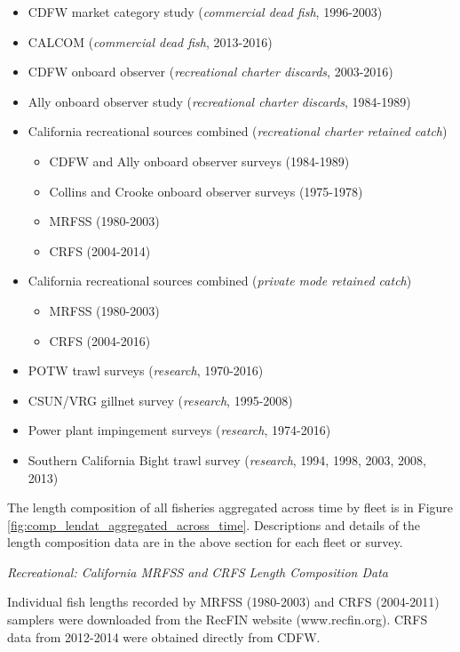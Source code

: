 \documentclass[12pt,]{article}
\begin{document}
\begin{itemize}[noitemsep,nolistsep,topsep=0pt]
  \item CDFW market category study (\emph{commercial dead fish}, 1996-2003)    
  \item CALCOM (\emph{commercial dead fish}, 2013-2016)    
  \item CDFW onboard observer (\emph{recreational charter discards}, 2003-2016)    
  \item Ally onboard observer study (\emph{recreational charter discards}, 1984-1989)  
  \item California recreational sources combined (\emph{recreational charter retained catch})     
    \begin{itemize}[noitemsep,nolistsep]
      \item CDFW and Ally onboard observer surveys (1984-1989)     
      \item Collins and Crooke onboard observer surveys (1975-1978)     
      \item MRFSS (1980-2003)     
      \item CRFS (2004-2014)
    \end{itemize}
 \item California recreational sources combined (\emph{private mode retained catch})      
    \begin{itemize}[noitemsep,nolistsep]   
      \item MRFSS (1980-2003)      
      \item CRFS (2004-2016)  
    \end{itemize}
 \item POTW trawl surveys (\emph{research}, 1970-2016)      
 \item CSUN/VRG gillnet survey (\emph{research}, 1995-2008)        
 \item Power plant impingement surveys (\emph{research}, 1974-2016)  
 \item Southern California Bight trawl survey (\emph{research}, 1994, 1998, 2003, 2008, 2013) 
\end{itemize}

The length composition of all fisheries aggregated across time by fleet
is in Figure \ref{fig:comp_lendat_aggregated_across_time}. Descriptions
and details of the length composition data are in the above section for
each fleet or survey.

\emph{Recreational: California MRFSS and CRFS Length Composition Data}

Individual fish lengths recorded by MRFSS (1980-2003) and CRFS
(2004-2011) samplers were downloaded from the RecFIN website
(www.recfin.org). CRFS data from 2012-2014 were obtained directly from
CDFW.
\end{document}

